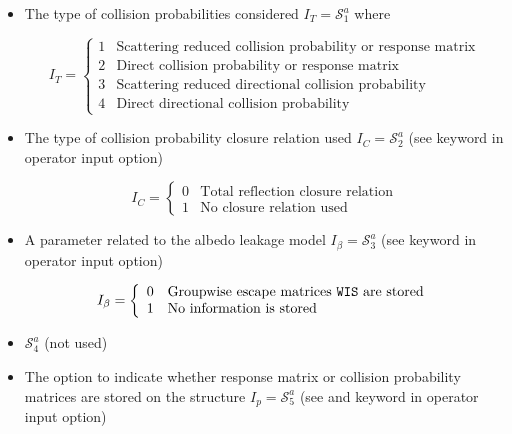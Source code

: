 \begin{itemize}
\item The type of collision probabilities considered $I_{T}=\mathcal{S}^{a}_{1}$ where

\begin{displaymath}
I_{T} = \left\{
\begin{array}{rl}
 1 & \textrm{Scattering reduced collision probability or response matrix}\\
 2 & \textrm{Direct collision probability or response matrix} \\ 
 3 & \textrm{Scattering reduced directional collision probability} \\ 
 4 & \textrm{Direct directional collision probability}  
\end{array} \right.
\end{displaymath}

\item The type of collision probability closure relation used $I_{C}=\mathcal{S}^{a}_{2}$
(see  keyword in  operator input option)

\begin{displaymath}
I_{C} = \left\{
\begin{array}{rl}
 0 & \textrm{Total reflection closure relation} \\
 1 & \textrm{No closure relation used}
\end{array} \right.
\end{displaymath}

\item A parameter related to the albedo leakage model $I_{\beta}=\mathcal{S}^{a}_{3}$
(see  keyword in  operator input option)

\begin{displaymath}
I_{\beta} = \left\{
\begin{array}{rl}
 0 & \textrm{Groupwise escape matrices \moc{WIS} are stored} \\
 1 & \textrm{No information is stored}
\end{array} \right.
\end{displaymath}

\item $\mathcal{S}^{a}_{4}$ (not used)

\item The option to indicate whether response matrix or collision probability matrices are stored
on the structure $I_{p}=\mathcal{S}^{a}_{5}$ (see  and 
keyword in  operator input option)


\end{itemize}
